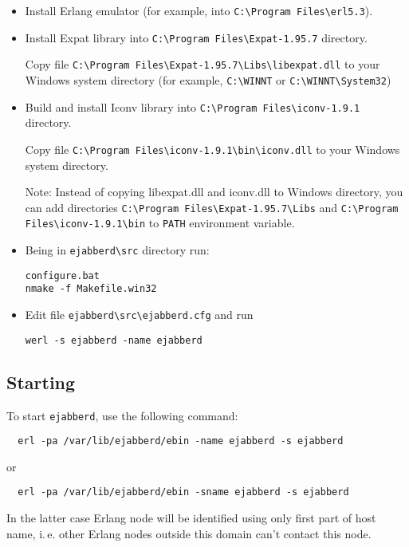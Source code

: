 \documentclass[a4paper,10pt]{article}
\newcommand{\ejabberd}{\texttt{ejabberd}}
\begin{document}
\begin{itemize}
\item Install Erlang emulator (for example, into \verb|C:\Program Files\erl5.3|).
\item Install Expat library into \verb|C:\Program Files\Expat-1.95.7|
  directory.
  
  Copy file \verb|C:\Program Files\Expat-1.95.7\Libs\libexpat.dll|
  to your Windows system directory (for example, \verb|C:\WINNT| or
  \verb|C:\WINNT\System32|)
\item Build and install Iconv library into \verb|C:\Program Files\iconv-1.9.1| directory.
  
  Copy file \verb|C:\Program Files\iconv-1.9.1\bin\iconv.dll| to your
  Windows system directory.
  
  Note: Instead of copying libexpat.dll and iconv.dll to Windows
  directory, you can add directories
  \verb|C:\Program Files\Expat-1.95.7\Libs| and
  \verb|C:\Program Files\iconv-1.9.1\bin| to \verb|PATH| environment
  variable.
\item Being in \verb|ejabberd\src| directory run:
\begin{verbatim}
configure.bat
nmake -f Makefile.win32
\end{verbatim}
\item Edit file \verb|ejabberd\src\ejabberd.cfg| and run
\begin{verbatim}
werl -s ejabberd -name ejabberd
\end{verbatim}
\end{itemize}



\subsection{Starting}
\label{sec:starting}

To start \ejabberd{}, use the following command:
\begin{verbatim}
  erl -pa /var/lib/ejabberd/ebin -name ejabberd -s ejabberd
\end{verbatim}
or
\begin{verbatim}
  erl -pa /var/lib/ejabberd/ebin -sname ejabberd -s ejabberd
\end{verbatim}
In the latter case Erlang node will be identified using only first part of host
name, i.\,e. other Erlang nodes outside this domain can't contact this node.
\end{document}
